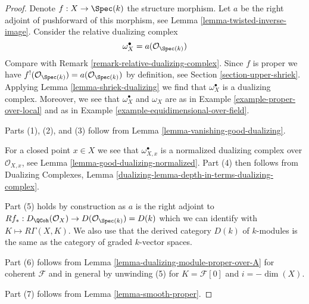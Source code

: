 \begin{proof}
Denote $f : X \to \Spec(k)$ the structure morphism. Let $a$ be the
right adjoint of pushforward of this morphism, see
Lemma \ref{lemma-twisted-inverse-image}. Consider the relative dualizing
complex
$$
\omega_X^\bullet = a(\mathcal{O}_{\Spec(k)})
$$
Compare with Remark \ref{remark-relative-dualizing-complex}.
Since $f$ is proper we have
$f^!(\mathcal{O}_{\Spec(k)}) = a(\mathcal{O}_{\Spec(k)})$ by
definition, see Section \ref{section-upper-shriek}.
Applying Lemma \ref{lemma-shriek-dualizing} we find that
$\omega_X^\bullet$ is a dualizing complex. Moreover, we see that
$\omega_X^\bullet$ and $\omega_X$ are as in
Example \ref{example-proper-over-local} and as in
Example \ref{example-equidimensional-over-field}.

\medskip\noindent
Parts (1), (2), and (3) follow from
Lemma \ref{lemma-vanishing-good-dualizing}.

\medskip\noindent
For a closed point $x \in X$ we see that $\omega_{X, x}^\bullet$ is a
normalized dualizing complex over $\mathcal{O}_{X, x}$, see
Lemma \ref{lemma-good-dualizing-normalized}.
Part (4) then follows from Dualizing Complexes, Lemma
\ref{dualizing-lemma-depth-in-terms-dualizing-complex}.

\medskip\noindent
Part (5) holds by construction as $a$ is the right adjoint to
$Rf_* : D_\QCoh(\mathcal{O}_X) \to D(\mathcal{O}_{\Spec(k)}) = D(k)$
which we can identify with $K \mapsto R\Gamma(X, K)$. We also use
that the derived category $D(k)$ of $k$-modules is the same as the
category of graded $k$-vector spaces.

\medskip\noindent
Part (6) follows from Lemma \ref{lemma-dualizing-module-proper-over-A}
for coherent $\mathcal{F}$ and in general by unwinding
(5) for $K = \mathcal{F}[0]$ and $i = -\dim(X)$.

\medskip\noindent
Part (7) follows from Lemma \ref{lemma-smooth-proper}.
\end{proof}


